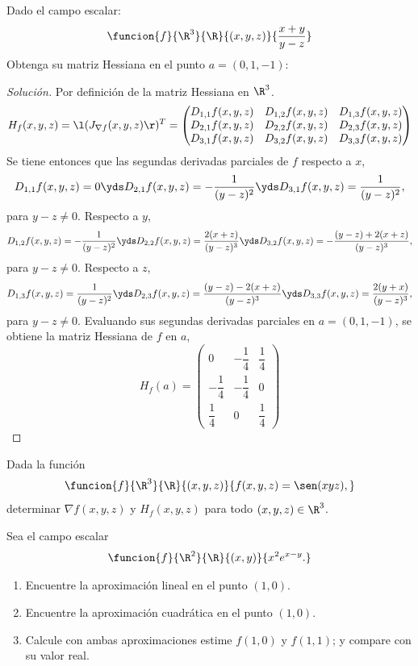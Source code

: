 \documentclass[a4,11pt]{aleph-notas}
\begin{document}
\encabezado

\begin{ejer}
Dado el campo escalar:
    \[
        \funcion{f}{\R^3}{\R}{(x,y,z)}{\dfrac{x+y}{y-z}}
    \]
Obtenga su matriz Hessiana en el punto $a=(0,1,-1)$:
\end{ejer}

\begin{proof}[Solución]
Por definición de la matriz Hessiana en $\R^3$.
    \[
        H_f(x,y,z)=\l(J_{\nabla f}(x,y,z)\r)^T= \begin{pmatrix}
        D_{1,1}f(x,y,z) & D_{1,2}f(x,y,z) & D_{1,3}f(x,y,z)\\
        D_{2,1}f(x,y,z) & D_{2,2}f(x,y,z) & D_{2,3}f(x,y,z)\\
        D_{3,1}f(x,y,z) & D_{3,2}f(x,y,z) & D_{3,3}f(x,y,z)
        \end{pmatrix}
    \]
Se tiene entonces que las segundas derivadas parciales de $f$ respecto a $x$,
    \[
        D_{1,1}f(x,y,z)=0
        \yds
        D_{2,1}f(x,y,z)=-\dfrac{1}{(y-z)^2}
        \yds
        D_{3,1}f(x,y,z)=\dfrac{1}{(y-z)^2},
    \]
para $y-z \neq 0$. Respecto a $y$,
    \[
        D_{1,2}f(x,y,z)=-\dfrac{1}{(y-z)^2}
        \yds
        D_{2,2}f(x,y,z)=\dfrac{2(x+z)}{(y-z)^3}
        \yds
        D_{3,2}f(x,y,z)=-\dfrac{(y-z)+2(x+z)}{(y-z)^3},
    \]
para $y-z \neq 0$. Respecto a $z$,
    \[
        D_{1,3}f(x,y,z)=\dfrac{1}{(y-z)^2}
        \yds
        D_{2,3}f(x,y,z)=\dfrac{(y-z)-2(x+z)}{(y-z)^3}
        \yds
        D_{3,3}f(x,y,z)=\dfrac{2(y+x)}{(y-z)^3},
    \]
para $y-z \neq 0$. Evaluando sus segundas derivadas parciales en $a=(0,1,-1)$, se obtiene la matriz Hessiana de $f$ en $a$,
    \[
        H_f(a)= \begin{pmatrix}
        0 & -\dfrac{1}{4} & \dfrac{1}{4}\\
        -\dfrac{1}{4} & -\dfrac{1}{4} & 0\\
        \dfrac{1}{4} & 0 & \dfrac{1}{4}
        \end{pmatrix}
    \]
\end{proof}

\begin{ejer}
Dada la función
    \[
        \funcion{f}{\R^3}{\R}{(x,y,z)}{f(x,y,z)=\sen(xyz),}
    \]
    determinar $\nabla f(x,y,z)$ y $H_f(x,y,z)$ para todo $(x,y,z)\in\R^3$.
\end{ejer}

\begin{ejer}
Sea el campo escalar
    \[
        \funcion{f}{\R^2}{\R}{(x,y)}{x^2e^{x-y}.}
    \]
\begin{enumerate}
    \item Encuentre la aproximación lineal en el punto $(1,0)$.
    \item Encuentre la aproximación cuadrática en el punto $(1,0)$.
    \item Calcule con ambas aproximaciones estime $f(1,0)$ y $f(1,1)$; y compare con su valor real.
\end{enumerate}
\end{ejer}
\end{document}
